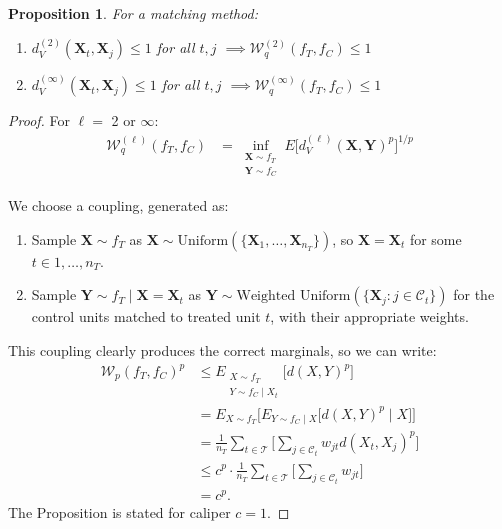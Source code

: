 \documentclass{article}
\newtheorem{proposition}[theorem]{Proposition}
\newcommand{\bX}{\mathbf{X}}
\newcommand{\Xt}{\mathbf{X}_t}
\newcommand{\Xj}{\mathbf{X}_j}
\newcommand{\Ct}{\mathcal{C}_{t}}
\begin{document}
\begin{proposition}
\label{prop:wass_real}
    For a matching method:
    \begin{enumerate}[label=(\alph*)]
        \item $d^{(2)}_V(\Xt, \Xj) \leq 1$ for all $t,j$ 
            $\implies \mathcal{W}^{(2)}_q(f_T, f_C) \leq 1$
        \item $d^{(\infty)}_V(\Xt, \Xj) \leq 1$ for all $t,j$ 
            $\implies \mathcal{W}^{(\infty)}_q(f_T, f_C) \leq 1$
    \end{enumerate}
\end{proposition}
\begin{proof}
    For $\ell = $ 2 or $\infty$:
    \begin{align*}
    \mathcal{W}_q^{(\ell)} (f_T, f_C) 
    &= \inf_{\substack{\bX \sim f_T \\ \mathbf{Y} \sim f_C}} E\big[ d_V^{(\ell)}(\bX, \mathbf{Y})^p \big]^{1/p}
    \end{align*}
    
    We choose a coupling, generated as:
    \begin{enumerate}
        \item Sample $\bX \sim f_T$ as $\bX \sim \text{Uniform}(\{\bX_1, \dots, \bX_{n_T}\})$, so $\bX = \Xt$ for some $t \in 1, \dots, n_T$.
        \item Sample $\mathbf{Y} \sim f_T \mid \bX = \Xt$ as $\mathbf{Y} \sim \text{Weighted Uniform}(\{\bX_j : j \in \Ct\})$ for the control units matched to treated unit $t$, with their appropriate weights.
    \end{enumerate}
    This coupling clearly produces the correct marginals, so we can write:
    \begin{align*}
    \mathcal{W}_p(f_T, f_C)^p
    &\leq E_{\substack{X \sim f_T \\ Y \sim f_C\mid X_t}} \big[ d(X, Y)^p \big] \\
    &= E_{X \sim f_T} \Big[ E_{Y \sim f_C \mid X} \big[ d(X,Y)^p \mid X \big] \Big] \\
    &= \frac{1}{n_T} \sum_{t \in \mathcal{T}} \Big[ \sum_{j \in \Ct} w_{jt} d(X_t, X_j)^p \Big] \\
    &\leq c^p \cdot \frac{1}{n_T} \sum_{t \in \mathcal{T}} \Big[ \sum_{j \in \Ct} w_{jt} \Big] \\
    &= c^p.
    \end{align*}
    The Proposition is stated for caliper $c=1$.
\end{proof}
\end{document}

